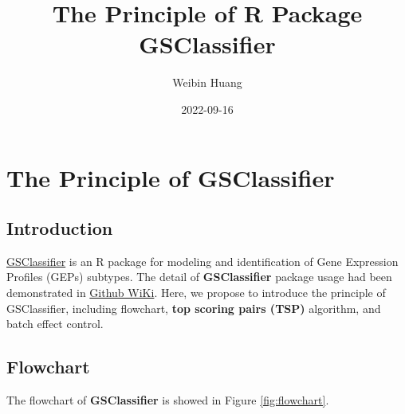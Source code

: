 \documentclass[
  12pt,
]{book}
\title{The Principle of R Package GSClassifier}
\author{Weibin Huang}
\date{2022-09-16}
\begin{document}
\maketitle

{
\hypersetup{linkcolor=}
\setcounter{tocdepth}{2}
\tableofcontents
}
\hypertarget{the-principle-of-gsclassifier}{%
\chapter{The Principle of GSClassifier}\label{the-principle-of-gsclassifier}}

\hypertarget{introduction}{%
\section{Introduction}\label{introduction}}

\href{https://github.com/huangwb8/GSClassifier}{GSClassifier} is an R package for modeling and identification of Gene Expression Profiles (GEPs) subtypes. The detail of \textbf{GSClassifier} package usage had been demonstrated in \href{https://github.com/huangwb8/GSClassifier/wiki}{Github WiKi}. Here, we propose to introduce the principle of GSClassifier, including flowchart, \textbf{top scoring pairs (TSP)} algorithm, and batch effect control.

\hypertarget{flowchart}{%
\section{Flowchart}\label{flowchart}}

The flowchart of \textbf{GSClassifier} is showed in Figure \ref{fig:flowchart}.
\end{document}
